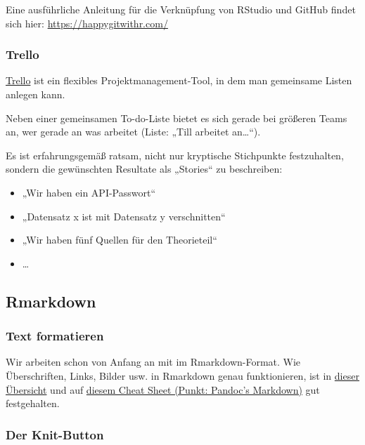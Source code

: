 \documentclass[
  ngerman,
]{article}
\providecommand{\tightlist}{%
  \setlength{\itemsep}{0pt}\setlength{\parskip}{0pt}}
\begin{document}
Eine ausführliche Anleitung für die Verknüpfung von RStudio und GitHub findet sich hier: \url{https://happygitwithr.com/}

\hypertarget{trello}{%
\subsubsection{Trello}\label{trello}}

\href{https://trello.com/de}{Trello} ist ein flexibles Projektmanagement-Tool, in dem man gemeinsame Listen anlegen kann.

Neben einer gemeinsamen To-do-Liste bietet es sich gerade bei größeren Teams an, wer gerade an was arbeitet (Liste: „Till arbeitet an\ldots``).

Es ist erfahrungsgemäß ratsam, nicht nur kryptische Stichpunkte festzuhalten, sondern die gewünschten Resultate als „Stories`` zu beschreiben:

\begin{itemize}
\tightlist
\item
  „Wir haben ein API-Passwort``
\item
  „Datensatz x ist mit Datensatz y verschnitten``
\item
  „Wir haben fünf Quellen für den Theorieteil``
\item
  \ldots{}
\end{itemize}

\hypertarget{rmarkdown}{%
\subsection{Rmarkdown}\label{rmarkdown}}

\hypertarget{text-formatieren}{%
\subsubsection{Text formatieren}\label{text-formatieren}}

Wir arbeiten schon von Anfang an mit im Rmarkdown-Format. Wie Überschriften, Links, Bilder usw. in Rmarkdown genau funktionieren, ist in \href{https://rmarkdown.rstudio.com/authoring_basics.html}{dieser Übersicht} und auf \href{https://www.rstudio.com/wp-content/uploads/2016/03/rmarkdown-cheatsheet-2.0.pdf}{diesem Cheat Sheet (Punkt: Pandoc's Markdown)} gut festgehalten.

\hypertarget{der-knit-button}{%
\subsubsection{Der Knit-Button}\label{der-knit-button}}
\end{document}
